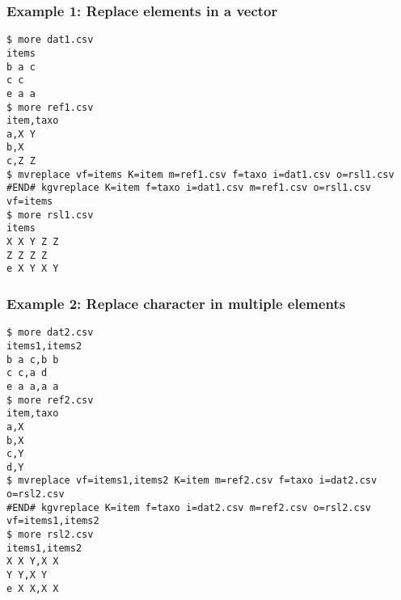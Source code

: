 \subsubsection*{Example 1: Replace elements in a vector}



\begin{Verbatim}[baselinestretch=0.7,frame=single]
$ more dat1.csv
items
b a c
c c
e a a
$ more ref1.csv
item,taxo
a,X Y
b,X
c,Z Z
$ mvreplace vf=items K=item m=ref1.csv f=taxo i=dat1.csv o=rsl1.csv
#END# kgvreplace K=item f=taxo i=dat1.csv m=ref1.csv o=rsl1.csv vf=items
$ more rsl1.csv
items
X X Y Z Z
Z Z Z Z
e X Y X Y
\end{Verbatim}
\subsubsection*{Example 2: Replace character in multiple elements}



\begin{Verbatim}[baselinestretch=0.7,frame=single]
$ more dat2.csv
items1,items2
b a c,b b
c c,a d
e a a,a a
$ more ref2.csv
item,taxo
a,X
b,X
c,Y
d,Y
$ mvreplace vf=items1,items2 K=item m=ref2.csv f=taxo i=dat2.csv o=rsl2.csv
#END# kgvreplace K=item f=taxo i=dat2.csv m=ref2.csv o=rsl2.csv vf=items1,items2
$ more rsl2.csv
items1,items2
X X Y,X X
Y Y,X Y
e X X,X X
\end{Verbatim}
